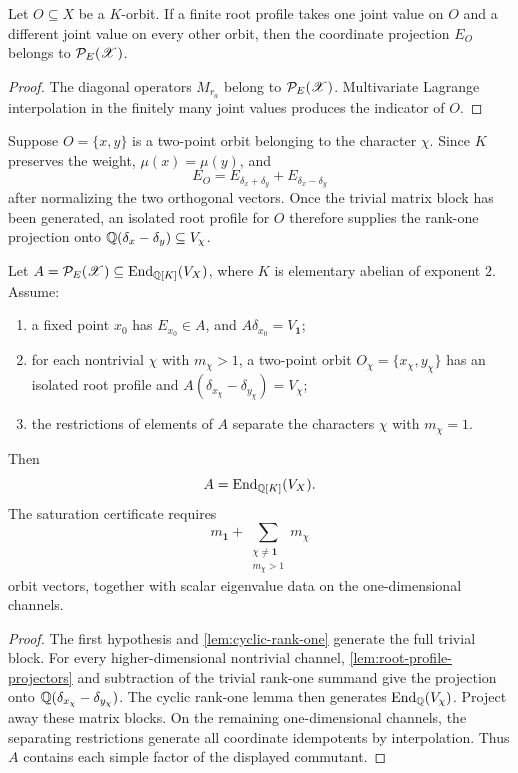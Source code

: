 \begin{lemma}
\label{lem:root-profile-projectors}
Let \(O\subseteq X\) be a \(K\)-orbit.  If a finite root profile takes one
joint value on \(O\) and a different joint value on every other orbit,
then the coordinate projection \(E_O\) belongs to \(\mathcal P_E(\mathscr X)\).
\end{lemma}

\begin{proof}
The diagonal operators \(M_{r_a}\) belong to \(\mathcal P_E(\mathscr X)\).
Multivariate Lagrange interpolation in the finitely many joint values
produces the indicator of \(O\).
\end{proof}

Suppose \(O=\{x,y\}\) is a two-point orbit belonging to the character
\(\chi\).  Since \(K\) preserves the weight, \(\mu(x)=\mu(y)\), and
\[
 E_O=E_{\delta_x+\delta_y}+E_{\delta_x-\delta_y}
\]
after normalizing the two orthogonal vectors.  Once the trivial matrix
block has been generated, an isolated root profile for \(O\) therefore
supplies the rank-one projection onto
\(\mathbb Q(\delta_x-\delta_y)\subseteq V_\chi\).

\begin{theorem}
\label{thm:root-cyclic-saturation}
Let \(A=\mathcal P_E(\mathscr X)\subseteq\operatorname{End}_{\mathbb Q[K]}(V_X)\), where \(K\) is
elementary abelian of exponent \(2\).  Assume:
\begin{enumerate}
\item a fixed point \(x_0\) has \(E_{x_0}\in A\), and
      \(A\delta_{x_0}=V_{\mathbf1}\);
\item for each nontrivial \(\chi\) with \(m_\chi>1\), a two-point orbit
      \(O_\chi=\{x_\chi,y_\chi\}\) has an isolated root profile and
      \(A(\delta_{x_\chi}-\delta_{y_\chi})=V_\chi\);
\item the restrictions of elements of \(A\) separate the characters
      \(\chi\) with \(m_\chi=1\).
\end{enumerate}
Then
\[
 A=\operatorname{End}_{\mathbb Q[K]}(V_X).
\]
The saturation certificate requires
\[
 m_{\mathbf1}+
 \sum_{\substack{\chi\ne\mathbf1\\m_\chi>1}}m_\chi
\]
orbit vectors, together with scalar eigenvalue data on the
one-dimensional channels.
\end{theorem}

\begin{proof}
The first hypothesis and \cref{lem:cyclic-rank-one} generate the full
trivial block.  For every higher-dimensional nontrivial channel,
\cref{lem:root-profile-projectors} and subtraction of the trivial
rank-one summand give the projection onto
\(\mathbb Q(\delta_{x_\chi}-\delta_{y_\chi})\).  The cyclic rank-one lemma then
generates \(\operatorname{End}_\mathbb Q(V_\chi)\).  Project away these matrix blocks.  On the
remaining one-dimensional channels, the separating restrictions generate
all coordinate idempotents by interpolation.  Thus \(A\) contains each
simple factor of the displayed commutant.
\end{proof}

